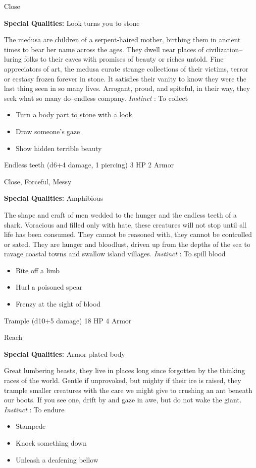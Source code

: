  Close


 \textbf{Special Qualities:}
 Look turns you to stone


 The medusa are children of a serpent-haired mother, birthing them in ancient times to bear her name across the ages. They dwell near places of civilization--luring folks to their caves with promises of beauty or riches untold. Fine appreciators of art, the medusa curate strange collections of their victims, terror or ecstasy frozen forever in stone. It satisfies their vanity to know they were the last thing seen in so many lives. Arrogant, proud, and spiteful, in their way, they seek what so many do--endless company. \emph{Instinct}
: To collect
\begin{itemize}
\item Turn a body part to stone with a look
\item Draw someone's gaze
\item Show hidden terrible beauty

\end{itemize}




 Endless teeth (d6+4 damage, 1 piercing) 3 HP 2 Armor


 Close, Forceful, Messy


 \textbf{Special Qualities:}
 Amphibious


 The shape and craft of men wedded to the hunger and the endless teeth of a shark. Voracious and filled only with hate, these creatures will not stop until all life has been consumed. They cannot be reasoned with, they cannot be controlled or sated. They are hunger and bloodlust, driven up from the depths of the sea to ravage coastal towns and swallow island villages. \emph{Instinct}
: To spill blood
\begin{itemize}
\item Bite off a limb
\item Hurl a poisoned spear
\item Frenzy at the sight of blood

\end{itemize}




 Trample (d10+5 damage) 18 HP 4 Armor


 Reach


 \textbf{Special Qualities:}
 Armor plated body


 Great lumbering beasts, they live in places long since forgotten by the thinking races of the world. Gentle if unprovoked, but mighty if their ire is raised, they trample smaller creatures with the care we might give to crushing an ant beneath our boots. If you see one, drift by and gaze in awe, but do not wake the giant. \emph{Instinct}
: To endure
\begin{itemize}
\item Stampede
\item Knock something down
\item Unleash a deafening bellow

\end{itemize}


